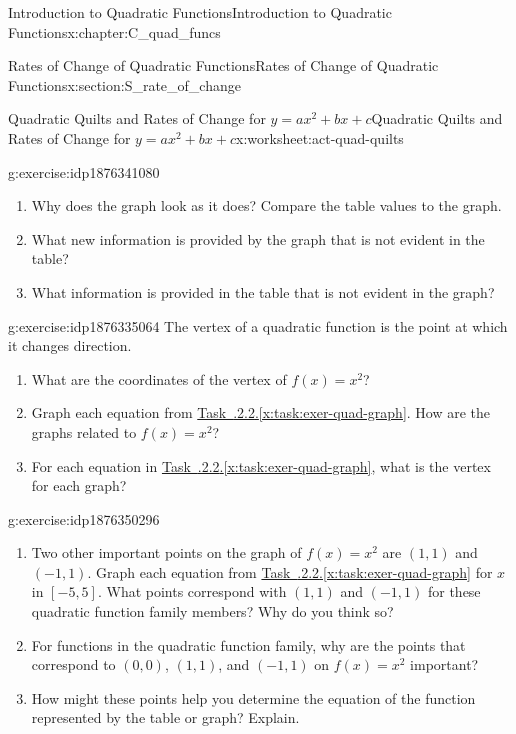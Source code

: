 \documentclass[oneside,10pt,]{book}
\newcommand{\xreffont}{\relax}
\numberwithin{equation}{chapter}
\begin{document}
\begin{chapterptx}{Introduction to Quadratic Functions}{}{Introduction to Quadratic Functions}{}{}{x:chapter:C_quad_funcs}
\begin{sectionptx}{Rates of Change of Quadratic Functions}{}{Rates of Change of Quadratic Functions}{}{}{x:section:S_rate_of_change}
\begin{worksheet-subsection}{Quadratic Quilts and Rates of Change for \(y = ax^2 + bx + c\)}{}{Quadratic Quilts and Rates of Change for \(y = ax^2 + bx + c\)}{}{}{x:worksheet:act-quad-quilts}
\begin{divisionexercise}{4}{}{}{g:exercise:idp1876341080}
\begin{enumerate}[font=\bfseries,label=(\alph*),ref=\alph*]
\item{}Why does the graph look as it does? Compare the table values to the graph.%
\item{}What new information is provided by the graph that is not evident in the table?%
\item{}What information is provided in the table that is not evident in the graph?%
\end{enumerate}
\end{divisionexercise}%
\begin{divisionexercise}{5}{}{}{g:exercise:idp1876335064}%
The vertex of a quadratic function is the point at which it changes direction.%
\begin{enumerate}[font=\bfseries,label=(\alph*),ref=\alph*]
\item{}What are the coordinates of the vertex of \(f(x)=x^2\)?%
\item{}Graph each equation from \hyperref[x:task:exer-quad-graph]{Task~{\xreffont 4.4.2.2}.{\xreffont\ref{x:task:exer-quad-graph}}}. How are the graphs related to \(f(x)=x^2\)?%
\item{}For each equation in \hyperref[x:task:exer-quad-graph]{Task~{\xreffont 4.4.2.2}.{\xreffont\ref{x:task:exer-quad-graph}}}, what is the vertex for each graph?%
\end{enumerate}
\end{divisionexercise}%
\begin{divisionexercise}{6}{}{}{g:exercise:idp1876350296}%
\begin{enumerate}[font=\bfseries,label=(\alph*),ref=\alph*]
\item{}Two other important points on the graph of \(f(x)=x^2 \) are \((1,1)\) and \((-1,1)\). Graph each equation from \hyperref[x:task:exer-quad-graph]{Task~{\xreffont 4.4.2.2}.{\xreffont\ref{x:task:exer-quad-graph}}} for \(x\) in \([-5, 5]\). What points correspond with \((1, 1)\) and \((-1, 1)\) for these quadratic function family members? Why do you think so?%
\item{}For functions in the quadratic function family, why are the points that correspond to \((0, 0)\), \((1, 1)\), and \((-1, 1)\) on \(f(x) = x^2\) important?%
\item{}How might these points help you determine the equation of the function represented by the table or graph? Explain.%
\end{enumerate}
\end{divisionexercise}%
\end{worksheet-subsection}
\restoregeometry
%
%

\end{sectionptx}
\end{chapterptx}
\end{document}
